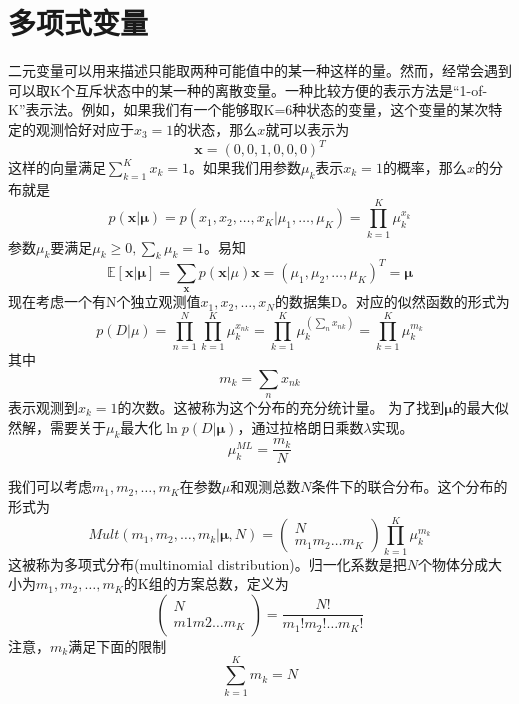 \section{多项式变量}
二元变量可以用来描述只能取两种可能值中的某一种这样的量。然而，经常会遇到可以取K个互斥状态中的某一种的离散变量。一种比较方便的表示方法是“1-of-K”表示法。例如，如果我们有一个能够取K=6种状态的变量，这个变量的某次特定的观测恰好对应于$x_3=1$的状态，那么$x$就可以表示为
\begin{equation}
	\boldsymbol{x}=(0,0,1,0,0,0)^T
\end{equation}
这样的向量满足$\sum_{k=1}^{K}x_k=1$。如果我们用参数$\mu_k$表示$x_k=1$的概率，那么$x$的分布就是
\begin{equation}
	p(\boldsymbol{x}|\boldsymbol{\mu})=p(x_1,x_2,\dots,x_K|\mu_1,\dots,\mu_K)=\prod_{k=1}^{K}\mu_k^{x_k}
\end{equation}
参数$\mu_k$要满足$\mu_k\geqslant 0,\sum_{k}\mu_k=1$。易知
\begin{equation}
	\mathbb{E}[\boldsymbol{x}|\boldsymbol{\mu}]=\sum_{\boldsymbol{x}}p(\boldsymbol{x}|\mu)\boldsymbol{x}=(\mu_1,\mu_2,\dots,\mu_K)^T=\boldsymbol{\mu}
\end{equation}
现在考虑一个有N个独立观测值$x_1,x_2,\dots,x_N$的数据集D。对应的似然函数的形式为
\begin{equation}
	p(D|\mu)=\prod_{n=1}^{N}\prod_{k=1}^{K}\mu_k^{x_{nk}}=\prod_{k=1}^{K}\mu_k^{(\sum_nx_{nk})}=\prod_{k=1}^{K}\mu_k^{m_k}
\end{equation}
其中
\begin{equation}
	m_k=\sum_nx_{nk}
\end{equation}
表示观测到$x_k=1$的次数。这被称为这个分布的充分统计量。
为了找到$\boldsymbol{\mu}$的最大似然解，需要关于$\mu_k$最大化$\ln p(D|\boldsymbol{\mu})$，通过拉格朗日乘数$\lambda$实现。
\begin{equation}
	\mu_k^{ML}=\frac{m_k}{N}
\end{equation}

我们可以考虑$m_1,m_2,\dots,m_K$在参数$\mu$和观测总数$N$条件下的联合分布。这个分布的形式为
\begin{equation}
	Mult(m_1,m_2,\dots,m_k|\boldsymbol{\mu},N)=
	\begin{pmatrix}
		N\\m_1m_2\dots m_K
	\end{pmatrix}
	\prod_{k=1}^{K}\mu_k^{m_k}
\end{equation}
这被称为多项式分布(multinomial distribution)。归一化系数是把$N$个物体分成大小为$m_1,m_2,\dots,m_K$的K组的方案总数，定义为
\begin{equation}
	\begin{pmatrix}
	N\\m1m2\dots m_K
	\end{pmatrix}
	=\frac{N!}{m_1!m_2!\dots m_K!}
\end{equation}
注意，$m_k$满足下面的限制 
\begin{equation}
	\sum_{k=1}^{K}m_k=N
\end{equation}

